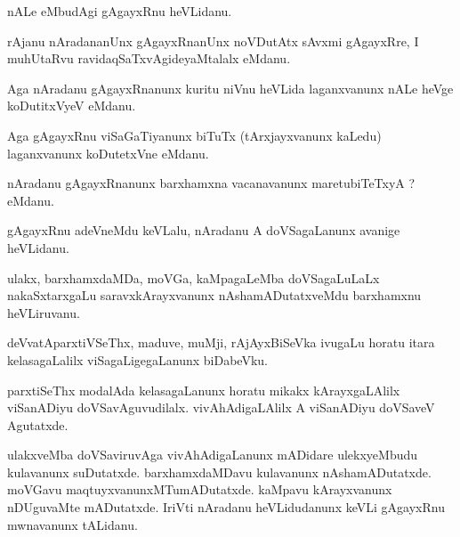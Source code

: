 \documentclass{article}
\begin{document}
\begin{mn}
nALe  eMbudAgi  gAgayxRnu  heVLidanu.
\end{mn}

\begin{mn}
rAjanu  nAradananUnx  gAgayxRnanUnx  noVDutAtx  sAvxmi  gAgayxRre,  I  muhUtaRvu  ravidaqSaTxvAgideyaMtalalx  eMdanu.
\end{mn}

\begin{mn}
Aga  nAradanu  gAgayxRnanunx  kuritu  niVnu  heVLida  laganxvanunx  nALe  heVge  koDutitxVyeV  eMdanu.
\end{mn}

\begin{mn}
Aga  gAgayxRnu  viSaGaTiyanunx  biTuTx (tArxjayxvanunx  kaLedu) laganxvanunx  koDutetxVne  eMdanu.
\end{mn}

\begin{mn}
nAradanu  gAgayxRnanunx  barxhamxna  vacanavanunx  maretubiTeTxyA ?  eMdanu.
\end{mn}

\begin{mn}
gAgayxRnu  adeVneMdu  keVLalu,  nAradanu  A  doVSagaLanunx  avanige  heVLidanu.
\end{mn}

\begin{mn}
ulakx,  barxhamxdaMDa,  moVGa,  kaMpagaLeMba  doVSagaLuLaLx  nakaSxtarxgaLu  saravxkArayxvanunx  nAshamADutatxveMdu  barxhamxnu  heVLiruvanu.
\end{mn}

\begin{mn}
deVvatAparxtiVSeThx,  maduve,  muMji,  rAjAyxBiSeVka  ivugaLu  horatu  itara  kelasagaLalilx  viSagaLigegaLanunx  biDabeVku.
\end{mn}

\begin{mn}
parxtiSeThx  modalAda  kelasagaLanunx  horatu  mikakx  kArayxgaLAlilx  viSanADiyu  doVSavAguvudilalx.  vivAhAdigaLAlilx  A  viSanADiyu  doVSaveV  Agutatxde.
\end{mn}

\begin{mn}
ulakxveMba  doVSaviruvAga  vivAhAdigaLanunx  mADidare  ulekxyeMbudu  kulavanunx  suDutatxde.  barxhamxdaMDavu  kulavanunx  nAshamADutatxde.  moVGavu  
maqtuyxvanunxMTumADutatxde.  kaMpavu  kArayxvanunx  nDUguvaMte  mADutatxde.  IriVti  nAradanu  heVLidudanunx  keVLi  gAgayxRnu  mwnavanunx  tALidanu.
\end{mn}
\end{document}
